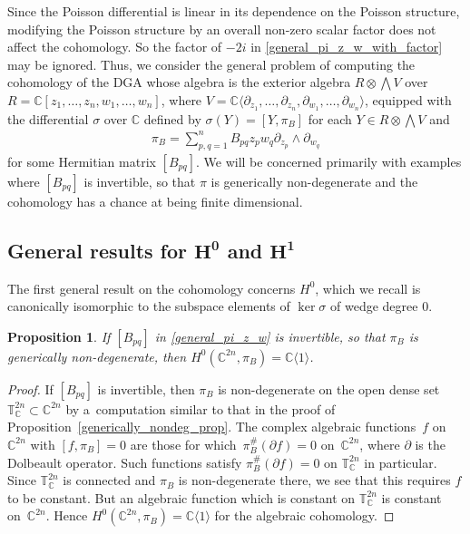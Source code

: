 \documentclass[10pt,a4paper]{amsart}
\numberwithin{equation}{section}
\newtheorem{Proposition}[Theorem]{Proposition}
 { \theoremstyle{definition}
\newtheorem{Definition}[Theorem]{Definition}
\newtheorem{Note}[Theorem]{Note}
\newtheorem{Example}[Theorem]{Example}
\newtheorem{Remark}[Theorem]{Remark} }
\begin{document}
Since the Poisson dif\/ferential is linear in its dependence on the Poisson structure, modifying the Poisson structure by an overall non-zero scalar factor does not af\/fect the coho\-mo\-logy. So the factor of $-2i$ in \eqref{general_pi_z_w_with_factor} may be ignored. Thus, we consider the general problem of computing the cohomology of the DGA whose algebra is the exterior algebra $R\otimes\bigwedge V$ over $R={\mathbb C}[z_1,\dots,z_n,w_1,\dots,w_n]$, where $V={\mathbb C}\langle\partial_{z_1},\dots,\partial_{z_n},\partial_{w_1},\dots,\partial_{w_n}\rangle$, equipped with the dif\/ferential $\sigma$ over ${\mathbb C}$ def\/ined by $\sigma(Y)=[Y,\pi_B]$ for each $Y\in R\otimes\bigwedge V$ and
\begin{gather}\label{general_pi_z_w}
\pi_B=\sum_{p,q=1}^n B_{pq} z_pw_q\partial_{z_p}\wedge\partial_{w_q}
\end{gather}
for some Hermitian matrix $[B_{pq}]$. We will be concerned primarily with examples where $[B_{pq}]$ is invertible, so that $\pi$ is generically non-degenerate and the cohomology has a chance at being f\/inite dimensional.

\subsection[General results for $H^{0}$ and $H^{1}$]{General results for $\boldsymbol{H^{0}}$ and $\boldsymbol{H^{1}}$}

The f\/irst general result on the cohomology concerns $H^0$, which we recall is canonically isomorphic to the subspace elements of $\ker\sigma$ of wedge degree $0$.

\begin{Proposition}\label{H0_prop}
If $[B_{pq}]$ in \eqref{general_pi_z_w} is invertible, so that $\pi_B$ is generically non-degenerate, then $H^0({\mathbb C}^{2n},\pi_B)={\mathbb C}\langle 1\rangle$.
\end{Proposition}
\begin{proof}
If $[B_{pq}]$ is invertible, then $\pi_B$ is non-degenerate on the open dense set ${\mathbb T}_{\mathbb C}^{2n}\subset{\mathbb C}^{2n}$ by a~computation similar to that in the proof of Proposition~\ref{generically_nondeg_prop}. The complex algebraic functions~$f$ on~${\mathbb C}^{2n}$ with $[f,\pi_B]=0$ are those for which~$\pi_B^\#(\partial f)=0$ on~${\mathbb C}^{2n}$, where $\partial$ is the Dolbeault operator. Such functions satisfy $\pi_B^\#(\partial f)=0$ on ${\mathbb T}_{\mathbb C}^{2n}$ in particular. Since ${\mathbb T}_{\mathbb C}^{2n}$ is connected and $\pi_B$ is non-degenerate there, we see that this requires $f$ to be constant. But an algebraic function which is constant on ${\mathbb T}_{\mathbb C}^{2n}$ is constant on~${\mathbb C}^{2n}$. Hence $H^0({\mathbb C}^{2n},\pi_B)={\mathbb C}\langle 1\rangle$ for the algebraic cohomology.
\end{proof}
\end{document}
